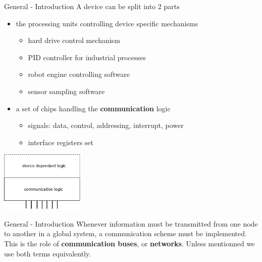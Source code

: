 \begin{frame}{General - Introduction}
  A device can be split into 2 parts
  \begin{itemize}
  \item the processing units controlling device specific mechanisms
    \begin{itemize}
    \item hard drive control mechanism
    \item PID controller for industrial processes
    \item robot engine controlling software
    \item sensor sampling software
    \end{itemize}
  \item a set of chips handling the \textbf{communication} logic
    \begin{itemize}
    \item signals: data, control, addressing, interrupt, power
    \item interface registers set
    \end{itemize}
  \end{itemize}

  \smallskip
  \begin{center}
    \includegraphics[width=0.3\textwidth]{figures/device_intro.jpg}
  \end{center}
\end{frame}

\begin{frame}{General - Introduction}
  Whenever information must be transmitted from one node to another in a global system,
  a communication scheme must be implemented. This is the role of \textbf{communication buses},
  or \textbf{networks}. Unless mentionned we use both terms equivalently.
\end{frame}

